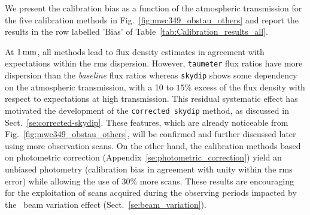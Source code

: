 We present the calibration bias as a function of the atmospheric
transmission for the five calibration methods in
Fig.~\ref{fig:mwc349_obstau_others} and report the results in the row
labelled 'Bias' of Table~\ref{tab:Calibration_results_all}.

At $1\,\rm{mm}$, all methods lead to flux density estimates in
agreement with expectations within the rms dispersion. However,
{\tt taumeter} flux ratios have more dispersion than
the \emph{baseline} flux ratios whereas {\tt skydip} shows some
dependency on the atmospheric
transmission, with a 10 to $15\%$ excess of the flux density with
respect to expectations at high transmission. This residual
systematic effect has motivated the development of the {\tt corrected
  skydip} method, as discussed in
Sect.~\ref{se:corrected-skydip}. These features, which are
already noticeable from Fig.~\ref{fig:mwc349_obstau_others}, will be
confirmed and further discussed later using more observation scans. On
the other hand, the calibration methods based on photometric
correction (Appendix~\ref{se:photometric_correction}) yield an
unbiased photometry (calibration bias in agreement with unity
within the rms error) while allowing the use of $30\%$ more
scans. These results are encouraging for the exploitation of scans
acquired during the observing periods
impacted by the \afternoon\ beam variation effect
(Sect.~\ref{se:beam_variation}).

